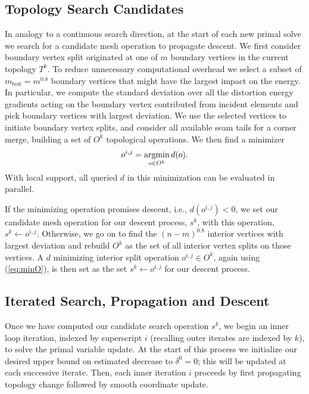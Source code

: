 \subsection{Topology Search Candidates}
\label{sec:descent_op}
In analogy to a continuous search direction, at the start of each new primal solve we search for a candidate mesh operation to propagate descent. 
%
We first consider boundary vertex split originated at one of $m$ boundary vertices in the current topology $T^k$. 
To reduce unnecessary computational overhead we select a subset of $m_\text{test}=m^{0.8}$ boundary vertices that might have the largest impact on the energy. In particular, we compute the standard deviation over all the distortion energy gradients acting on the boundary vertex contributed from incident elements and pick boundary vertices with largest deviation. We use the selected vertices to initiate boundary vertex splits, and consider all available seam tails for a corner merge, building a set of $O^k$ topological operations.
%
We then find a minimizer
\begin{align}
\label{eq:minO}
o^{i,j} = \operatorname*{argmin}_{o \in O^k} d(o).
\end{align}
With local support, all queried $d$ in this minimization can be evaluated in parallel. 

If the minimizing operation promises descent, i.e., $d(o^{i,j}) < 0$, we set our candidate mesh operation for our descent process, $s^k$, with this operation, $s^k \leftarrow o^{i,j}$. Otherwise, we go on to find the $(n-m)^{0.8}$ interior vertices with largest deviation and rebuild $O^k$ as the set of all interior vertex splits on those vertices. A $d$ minimizing interior split operation $o^{i,j} \in O^k$, again using (\ref{eq:minO}), is then set as the set $s^k \leftarrow o^{i,j}$ for our descent process.

\subsection{Iterated Search, Propagation and Descent}
\label{sec:topology_search}
Once we have computed our candidate search operation $s^k$, we begin an inner loop iteration, indexed by superscript $i$ (recalling outer iterates are indexed by $k$), to solve the primal variable update. At the start of this process we initialize our desired upper bound on estimated decrease to $\delta^0 = 0$; this will be updated at each successive iterate. Then, each inner iteration $i$ proceeds by first propagating topology change followed by smooth coordinate update. 


